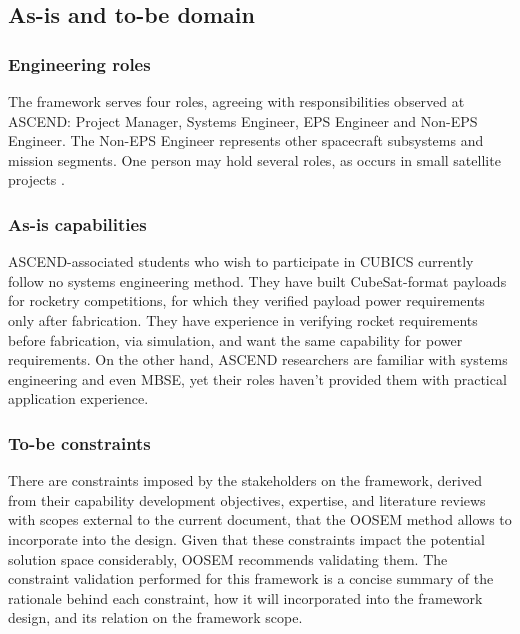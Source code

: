 \subsection{As-is and to-be domain}

\subsubsection*{Engineering roles}
The framework serves four roles, agreeing with responsibilities observed at ASCEND: Project Manager, Systems Engineer, EPS Engineer and Non-EPS Engineer.
The Non-EPS Engineer represents other spacecraft subsystems and mission segments.
One person may hold several roles, as occurs in small satellite projects \citep{review-1438}.

\subsubsection*{As-is capabilities}
ASCEND-associated students who wish to participate in CUBICS currently follow no systems engineering method.
They have built CubeSat-format payloads for rocketry competitions, for which they verified payload power requirements only after fabrication.
They have experience in verifying rocket requirements before fabrication, via simulation, and want the same capability for power requirements.
On the other hand, ASCEND researchers are familiar with systems engineering and even MBSE, yet their roles haven't provided them with practical application experience.

\subsubsection*{To-be constraints}
There are constraints imposed by the stakeholders on the framework, derived from their capability development objectives, expertise, and literature reviews with scopes external to the current document, that the OOSEM method allows to incorporate into the design.
Given that these constraints impact the potential solution space considerably, OOSEM recommends validating them. The constraint validation performed for this framework is a concise summary of the rationale behind each constraint, how it will incorporated into the framework design, and its relation on the framework scope.

